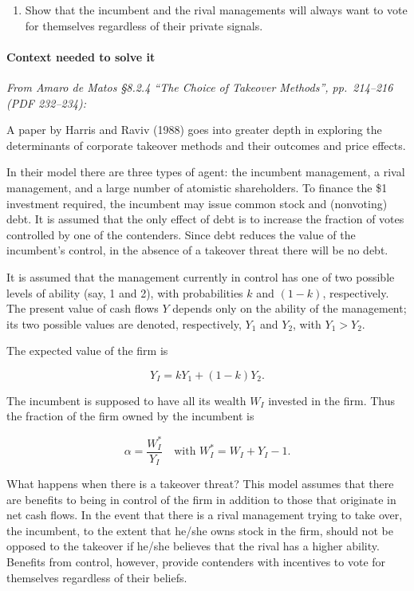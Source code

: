 \documentclass[11pt,a4paper]{article}
\providecommand{\tightlist}{\setlength{\itemsep}{0pt}\setlength{\parskip}{0pt}}
\begin{document}
\begin{enumerate}
\def\labelenumi{\arabic{enumi}.}
\setcounter{enumi}{9}
\tightlist
\item
  Show that the incumbent and the rival managements will always want to vote for themselves
  regardless of their private signals.
\end{enumerate}

\paragraph{Context needed to solve it}

\emph{From Amaro de Matos §8.2.4 ``The Choice of Takeover Methods'', pp.~214--216 (PDF 232--234):}

A paper by Harris and Raviv (1988) goes into greater depth in exploring the determinants of
corporate takeover methods and their outcomes and price effects.

In their model there are three types of agent: the incumbent management, a rival management, and a
large number of atomistic shareholders. To finance the \$1 investment required, the incumbent may
issue common stock and (nonvoting) debt. It is assumed that the only effect of debt is to increase
the fraction of votes controlled by one of the contenders. Since debt reduces the value of the
incumbent's control, in the absence of a takeover threat there will be no debt.

It is assumed that the management currently in control has one of two possible levels of ability
(say, 1 and 2), with probabilities \(k\) and \((1-k)\), respectively. The present value of cash
flows \(Y\) depends only on the ability of the management; its two possible values are denoted,
respectively, \(Y_1\) and \(Y_2\), with \(Y_1 > Y_2\).

The expected value of the firm is

\[Y_I = kY_1 + (1-k)Y_2.\]

The incumbent is supposed to have all its wealth \(W_I\) invested in the firm. Thus the fraction of
the firm owned by the incumbent is

\[\alpha = \frac{W_I^*}{Y_I} \quad\text{with } W_I^* = W_I + Y_I - 1.\]

What happens when there is a takeover threat? This model assumes that there are benefits to being in
control of the firm in addition to those that originate in net cash flows. In the event that there
is a rival management trying to take over, the incumbent, to the extent that he/she owns stock in
the firm, should not be opposed to the takeover if he/she believes that the rival has a higher
ability. Benefits from control, however, provide contenders with incentives to vote for themselves
regardless of their beliefs.
\end{document}

